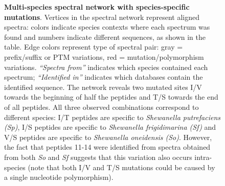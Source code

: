 \documentclass[arial,11pt]{article}
\begin{document}
\begin{figure}[!t]
\small
\centering

\caption{\footnotesize{\bf Multi-species spectral network with species-specific mutations}. Vertices in the spectral network represent aligned spectra: colors indicate species contexts where each spectrum was found and numbers indicate different sequences, as shown in the table. Edge colors represent type of spectral pair: gray = prefix/suffix or PTM variations, red = mutation/polymorphism variations. \emph{``Spectra from''} indicates which species contained each spectrum; \emph{``Identified in''} indicates which databases contain the identified sequence. The network reveals two mutated sites I/V towards the beginning of half the peptides and T/S towards the end of all peptides. %
All three observed combinations correspond to different species: I/T peptides are specific to {\em Shewanella putrefaciens (Sp)}, I/S peptides are specific to {\em Shewanella frigidimarina (Sf)} and V/S peptides are specific to {\em Shewanella oneidensis (So)}. However, the fact that peptides 11-14 were identified from spectra obtained from both {\em So} and {\em Sf} suggests that this variation also occurs intra-species (note that both I/V and T/S mutations could be caused by a single nucleotide polymorphism).}
\label{trd.snets.fig.shewanella}
\end{figure}
\normalsize
\end{document}
